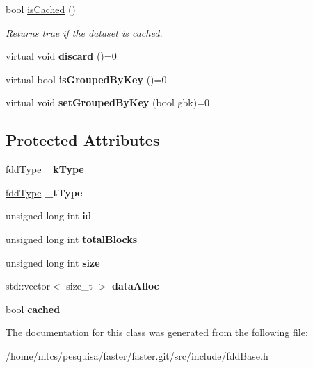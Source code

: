 \begin{DoxyCompactItemize}
\hypertarget{classfaster_1_1fddBase_ae2b4fdf3a1e7ac336b21f5e197dfb4a7}{}\label{classfaster_1_1fddBase_ae2b4fdf3a1e7ac336b21f5e197dfb4a7} 
bool \hyperlink{classfaster_1_1fddBase_ae2b4fdf3a1e7ac336b21f5e197dfb4a7}{is\+Cached} ()
\begin{DoxyCompactList}\small\item\em Returns true if the dataset is cached. \end{DoxyCompactList}\item 
\hypertarget{classfaster_1_1fddBase_a4cbed7c20357b0732414af58a9d60380}{}\label{classfaster_1_1fddBase_a4cbed7c20357b0732414af58a9d60380} 
virtual void {\bfseries discard} ()=0
\item 
\hypertarget{classfaster_1_1fddBase_a14ec9acc33546362f86ac34b369956fa}{}\label{classfaster_1_1fddBase_a14ec9acc33546362f86ac34b369956fa} 
virtual bool {\bfseries is\+Grouped\+By\+Key} ()=0
\item 
\hypertarget{classfaster_1_1fddBase_a0758eda48ad1cee20071ba8ce1852037}{}\label{classfaster_1_1fddBase_a0758eda48ad1cee20071ba8ce1852037} 
virtual void {\bfseries set\+Grouped\+By\+Key} (bool gbk)=0
\end{DoxyCompactItemize}
\subsection*{Protected Attributes}
\begin{DoxyCompactItemize}
\item 
\hypertarget{classfaster_1_1fddBase_a585bdd9659c1ab92cf615c73fc4d9ac7}{}\label{classfaster_1_1fddBase_a585bdd9659c1ab92cf615c73fc4d9ac7} 
\hyperlink{namespacefaster_aa8898687bc64536b60a3d5f365060cd6}{fdd\+Type} {\bfseries \+\_\+k\+Type}
\item 
\hypertarget{classfaster_1_1fddBase_a7ee5fc280f8eed2ffe97ef9c7a8b0919}{}\label{classfaster_1_1fddBase_a7ee5fc280f8eed2ffe97ef9c7a8b0919} 
\hyperlink{namespacefaster_aa8898687bc64536b60a3d5f365060cd6}{fdd\+Type} {\bfseries \+\_\+t\+Type}
\item 
\hypertarget{classfaster_1_1fddBase_a6ebf1389a80e31abed31f5b85d99fa1a}{}\label{classfaster_1_1fddBase_a6ebf1389a80e31abed31f5b85d99fa1a} 
unsigned long int {\bfseries id}
\item 
\hypertarget{classfaster_1_1fddBase_ac69c521f69cbe163b676f7723c9dd024}{}\label{classfaster_1_1fddBase_ac69c521f69cbe163b676f7723c9dd024} 
unsigned long int {\bfseries total\+Blocks}
\item 
\hypertarget{classfaster_1_1fddBase_a397adc12ccc9f7eccce83dfef625487c}{}\label{classfaster_1_1fddBase_a397adc12ccc9f7eccce83dfef625487c} 
unsigned long int {\bfseries size}
\item 
\hypertarget{classfaster_1_1fddBase_a47961f2f165f2e148d9cbbd1b59090d3}{}\label{classfaster_1_1fddBase_a47961f2f165f2e148d9cbbd1b59090d3} 
std\+::vector$<$ size\+\_\+t $>$ {\bfseries data\+Alloc}
\item 
\hypertarget{classfaster_1_1fddBase_acd5a472da183f35b13197804acadac4e}{}\label{classfaster_1_1fddBase_acd5a472da183f35b13197804acadac4e} 
bool {\bfseries cached}
\end{DoxyCompactItemize}


The documentation for this class was generated from the following file\+:\begin{DoxyCompactItemize}
\item 
/home/mtcs/pesquisa/faster/faster.\+git/src/include/fdd\+Base.\+h\end{DoxyCompactItemize}
